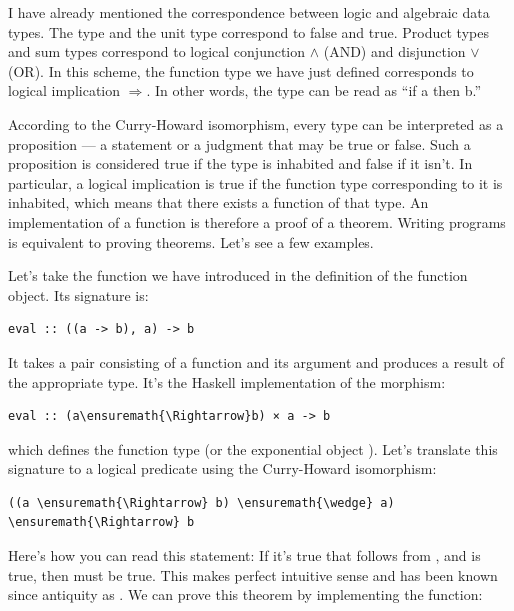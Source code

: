 I have already mentioned the correspondence between logic and algebraic
data types. The  type and the unit type \code{()}
correspond to false and true. Product types and sum types correspond to
logical conjunction \ensuremath{\wedge} (AND) and disjunction \ensuremath{\vee} (OR). In this scheme, the
function type we have just defined corresponds to logical implication \ensuremath{\Rightarrow}.
In other words, the type  can be read as ``if
a then b.''

According to the Curry-Howard isomorphism, every type can be interpreted
as a proposition --- a statement or a judgment that may be true or
false. Such a proposition is considered true if the type is inhabited
and false if it isn't. In particular, a logical implication is true if
the function type corresponding to it is inhabited, which means that
there exists a function of that type. An implementation of a function is
therefore a proof of a theorem. Writing programs is equivalent to
proving theorems. Let's see a few examples.

Let's take the function  we have introduced in the
definition of the function object. Its signature is:

\begin{Verbatim}[commandchars=\\\{\}]
eval :: ((a -> b), a) -> b
\end{Verbatim}
It takes a pair consisting of a function and its argument and produces a
result of the appropriate type. It's the Haskell implementation of the
morphism:

\begin{Verbatim}[commandchars=\\\{\}]
eval :: (a\ensuremath{\Rightarrow}b) × a -> b
\end{Verbatim}
which defines the function type  (or the exponential object
). Let's translate this signature to a logical predicate
using the Curry-Howard isomorphism:

\begin{Verbatim}[commandchars=\\\{\}]
((a \ensuremath{\Rightarrow} b) \ensuremath{\wedge} a) \ensuremath{\Rightarrow} b
\end{Verbatim}
Here's how you can read this statement: If it's true that 
follows from , and  is true, then  must be
true. This makes perfect intuitive sense and has been known since
antiquity as . We can prove this theorem by
implementing the function:

